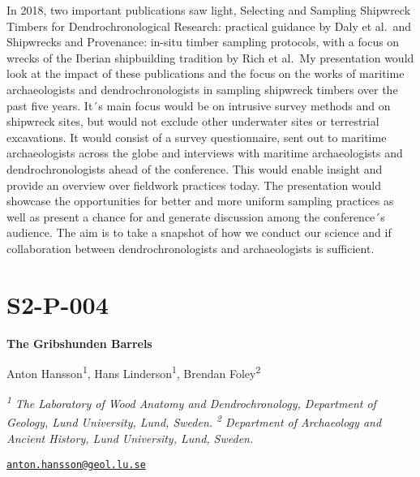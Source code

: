 \documentclass[
]{book}
\begin{document}
In 2018, two important publications saw light, Selecting and Sampling Shipwreck Timbers for Dendrochronological Research: practical guidance by Daly et al.~and Shipwrecks and Provenance: in-situ timber sampling protocols, with a focus on wrecks of the Iberian shipbuilding tradition by Rich et al.~My presentation would look at the impact of these publications and the focus on the works of maritime archaeologists and dendrochronologists in sampling shipwreck timbers over the past five years. It´s main focus would be on intrusive survey methods and on shipwreck sites, but would not exclude other underwater sites or terrestrial excavations. It would consist of a survey questionnaire, sent out to maritime archaeologists across the globe and interviews with maritime archaeologists and dendrochronologists ahead of the conference. This would enable insight and provide an overview over fieldwork practices today. The presentation would showcase the opportunities for better and more uniform sampling practices as well as present a chance for and generate discussion among the conference´s audience. The aim is to take a snapshot of how we conduct our science and if collaboration between dendrochronologists and archaeologists is sufficient.

\hypertarget{s2-p-004}{%
\section*{S2-P-004}\label{s2-p-004}}

\textbf{The Gribshunden Barrels}

Anton Hansson\textsuperscript{1}, Hans Linderson\textsuperscript{1}, Brendan Foley\textsuperscript{2}

\textsuperscript{\emph{1}} \emph{The Laboratory of Wood Anatomy and Dendrochronology, Department of Geology, Lund University, Lund, Sweden. \textsuperscript{2} Department of Archaeology and Ancient History, Lund University, Lund, Sweden.}

\href{mailto:anton.hansson@geol.lu.se}{\nolinkurl{anton.hansson@geol.lu.se}}
\end{document}
